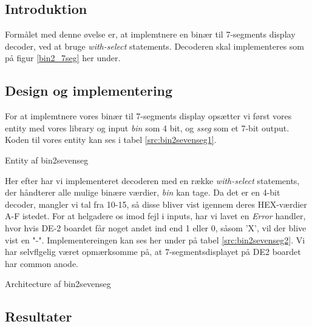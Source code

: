 \documentclass[../journal2.tex]{subfiles}
\begin{document}
\subsection{Introduktion}

Formålet med denne øvelse er, at implemtnere en binær til 7-segments display decoder, ved at bruge \textit{with-select} statements. Decoderen skal implementeres som på figur \ref{bin2_7seg} her under.


\subsection{Design og implementering}

For at implemtnere vores binær til 7-segments display opsætter vi først vores entity med vores library og input \textit{bin} som 4 bit, og \textit{sseg} som et 7-bit output. Koden til vores entity kan ses i tabel \ref{src:bin2sevenseg1}.

\begin{table}[!hbt]
  \centering
    \framebox{
      \rule{8pt}{0pt}
        
}
\caption{Entity af bin2sevenseg}
\label{src:bin2sevenseg1}
\end{table}

Her efter har vi implementeret decoderen med en række \textit{with-select} statements, der håndterer alle mulige binære værdier, \textit{bin} kan tage. Da det er en 4-bit decoder, mangler vi tal fra 10-15, så disse bliver vist igennem deres HEX-værdier A-F istedet. For at helgadere os imod fejl i inputs, har vi lavet en \textit{Error} handler, hvor hvis DE-2 boardet får noget andet ind end 1 eller 0, såsom 'X', vil der blive vist en "-". Implementereingen kan ses her under på tabel \ref{src:bin2sevenseg2}. Vi har selvflgelig været opmærksomme på, at 7-segmentsdisplayet på DE2 boardet har common anode.

\begin{table}[H]
    \centering
      \framebox{
        \rule{8pt}{0pt}
          
  }
  \caption{Architecture af bin2sevenseg}
  \label{src:bin2sevenseg2}
\end{table}

\subsection{Resultater}
\end{document}
